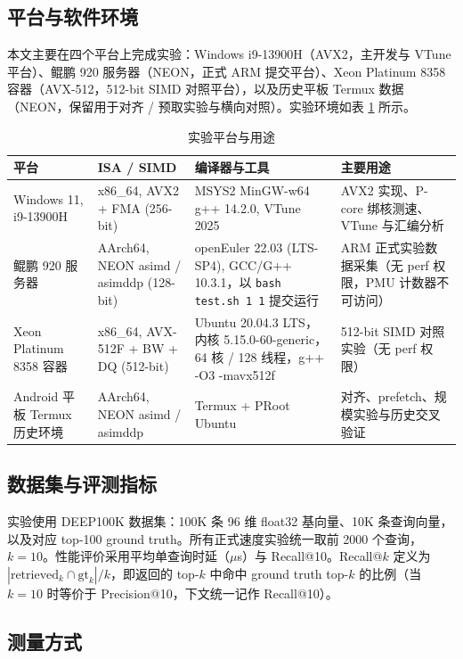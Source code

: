 \documentclass[a4paper,11pt,UTF8]{ctexart}
\begin{document}
\subsection{平台与软件环境}

本文主要在四个平台上完成实验：Windows i9-13900H（AVX2，主开发与 VTune 平台）、鲲鹏 920 服务器（NEON，正式 ARM 提交平台）、Xeon Platinum 8358 容器（AVX-512，512-bit SIMD 对照平台），以及历史平板 Termux 数据（NEON，保留用于对齐 / 预取实验与横向对照）。实验环境如表 \ref{tab:env} 所示。

\begin{table}[H]
  \centering\small
  \begin{tabular}{p{2.7cm}p{2.3cm}p{3.2cm}p{4.7cm}}
    \toprule
    平台 & ISA / SIMD & 编译器与工具 & 主要用途 \\
    \midrule
    Windows 11, i9-13900H & x86\_64, AVX2 + FMA (256-bit) & MSYS2 MinGW-w64 g++ 14.2.0, VTune 2025 & AVX2 实现、P-core 绑核测速、VTune 与汇编分析 \\
    鲲鹏 920 服务器 & AArch64, NEON asimd / asimddp (128-bit) & openEuler 22.03 (LTS-SP4), GCC/G++ 10.3.1，以 \texttt{bash test.sh 1 1} 提交运行 & ARM 正式实验数据采集（无 perf 权限，PMU 计数器不可访问）\\
    Xeon Platinum 8358 容器 & x86\_64, AVX-512F + BW + DQ (512-bit) & Ubuntu 20.04.3 LTS，内核 5.15.0-60-generic，64 核 / 128 线程，g++ -O3 -mavx512f & 512-bit SIMD 对照实验（无 perf 权限） \\
    Android 平板 Termux 历史环境 & AArch64, NEON asimd / asimddp & Termux + PRoot Ubuntu & 对齐、prefetch、规模实验与历史交叉验证 \\
    \bottomrule
  \end{tabular}
  \caption{实验平台与用途}
  \label{tab:env}
\end{table}

\subsection{数据集与评测指标}

实验使用 DEEP100K 数据集：100K 条 96 维 float32 基向量、10K 条查询向量，以及对应 top-100 ground truth。所有正式速度实验统一取前 2000 个查询，$k=10$。性能评价采用平均单查询时延（$\mu$s）与 Recall@10。Recall@$k$ 定义为 $|\text{retrieved}_k \cap \text{gt}_k| / k$，即返回的 top-$k$ 中命中 ground truth top-$k$ 的比例（当 $k=10$ 时等价于 Precision@10，下文统一记作 Recall@10）。

\subsection{测量方式}
\end{document}
